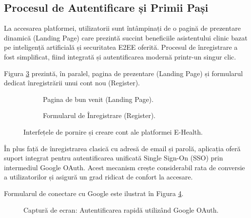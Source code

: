 \subsection{Procesul de Autentificare și Primii Pași}
La accesarea platformei, utilizatorii sunt întâmpinați de o pagină de prezentare dinamică (Landing Page) care prezintă succint beneficiile asistentului clinic bazat pe inteligență artificială și securitatea E2EE oferită. Procesul de înregistrare a fost simplificat, fiind integrată și autentificarea modernă printr-un singur clic.

Figura \ref{fig:landing_and_register} prezintă, în paralel, pagina de prezentare (Landing Page) și formularul dedicat înregistrării unui cont nou (Register).

\begin{figure}[H]
    \centering
    \begin{subfigure}[b]{0.49\textwidth}
        \centering
        \color{red}
        \caption{Pagina de bun venit (Landing Page).}
        \label{fig:screenshot_landing}
    \end{subfigure}
    \hfill
    \begin{subfigure}[b]{0.49\textwidth}
        \centering
        \color{red}
        \caption{Formularul de Înregistrare (Register).}
        \label{fig:screenshot_register}
    \end{subfigure}
    \caption{Interfețele de pornire și creare cont ale platformei E-Health.}
    \label{fig:landing_and_register}
\end{figure}

În plus față de înregistrarea clasică cu adresă de email și parolă, aplicația oferă suport integrat pentru autentificarea unificată Single Sign-On (SSO) prin intermediul Google OAuth. Acest mecanism crește considerabil rata de conversie a utilizatorilor și asigură un grad ridicat de confort la accesare. 

Formularul de conectare cu Google este ilustrat în Figura \ref{fig:screenshot_oauth}.

\begin{figure}[H]
    \centering
    \color{red}
    \caption{Captură de ecran: Autentificarea rapidă utilizând Google OAuth.}
    \label{fig:screenshot_oauth}
\end{figure}

